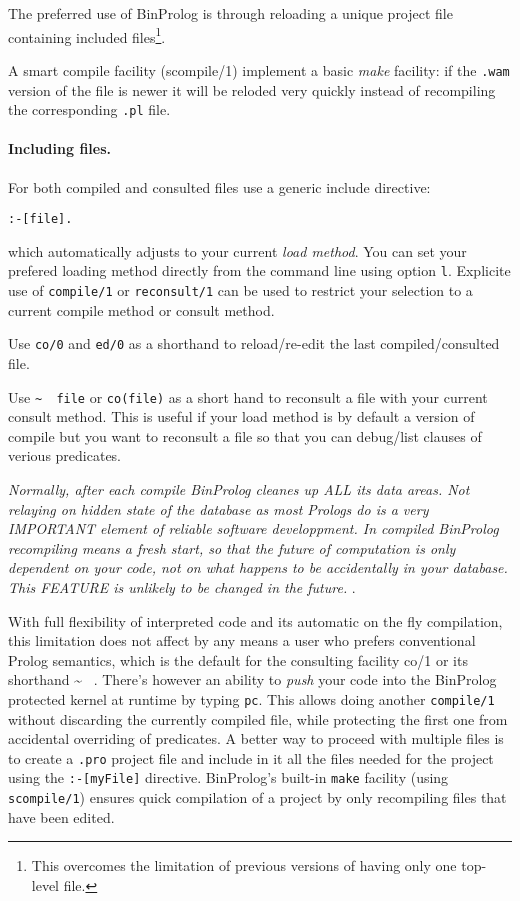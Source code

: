 \documentclass{article}
\begin{document}
The preferred use of BinProlog is through reloading a unique
project file containing included files\footnote{This overcomes the limitation of previous versions of
having only one top-level file.}.

A smart compile facility (scompile/1) implement a basic
{\em make} facility: if the {\tt *.wam} version of the file
is newer it will be reloded very quickly instead of recompiling the
corresponding {\tt *.pl} file.

\paragraph{Including files.} 
For both compiled and consulted files use a generic include directive:

\begin{verbatim}
:-[file].
\end{verbatim}

which automatically adjusts to your current {\em load method}.
You can set your prefered loading method directly from the command line
using option {\tt \-l}. Explicite use of {\tt compile/1} or {\tt reconsult/1} can be used to restrict your selection to a current
compile method or consult method.

Use {\tt co/0} and {\tt ed/0} as a shorthand to reload/re-edit
the last compiled/consulted file.

Use {\tt \~~ file} or {\tt co(file)} as a short hand to reconsult a file with your
current consult method. This is useful if your load method is
by default a version of compile but you want to reconsult a file
so that you can debug/list clauses of verious predicates.

{\em Normally, after each compile BinProlog
cleanes up ALL its data areas. Not relaying on hidden state
of the database as most Prologs do is a very IMPORTANT
element of reliable software developpment. In compiled BinProlog
recompiling means a fresh start, so that the future of
computation is only dependent on your code, not on
what happens to be accidentally in your database.
This FEATURE is unlikely to be changed in the future.
}.

With full flexibility of interpreted code and its automatic
on the fly compilation, this limitation does not affect by
any means a user who prefers conventional Prolog semantics,
which is the default for the consulting facility co/1 or its shorthand \~~ .
There's however an ability to {\em push} your code into
the BinProlog protected kernel at runtime by typing {\tt pc}.
This allows doing another {\tt compile/1} without discarding the currently
compiled file, while protecting the first one from
accidental overriding of predicates.
A better way to proceed with multiple files is to create a {\tt *.pro}
project file and include in it all the files needed for the project
using the {\tt :-[myFile]} directive. BinProlog's built-in {\tt make}
facility (using {\tt scompile/1}) ensures quick compilation of
a project by only recompiling files that have been edited.
\end{document}

